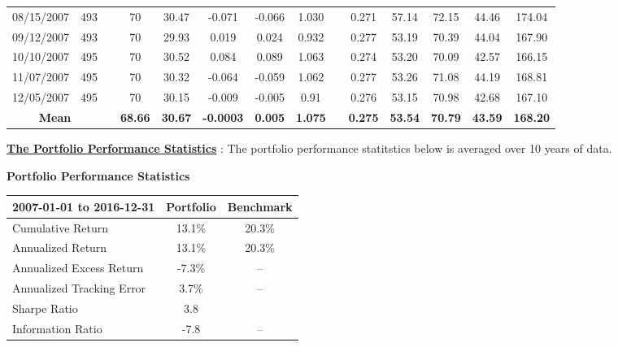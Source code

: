 \documentclass[11pt]{article}
\begin{document}
\begin{table}[]
{\begin{tabular}{cccccccccccccc}
				08/15/2007 & 493 &  & 70 & 30.47 & -0.071 & -0.066 & 1.030 &  & 0.271 & 57.14 & 72.15 & 44.46 & 174.04 \\
				09/12/2007 & 493 &  & 70 & 29.93 & 0.019 & 0.024 & 0.932 &  & 0.277 & 53.19 & 70.39 & 44.04 & 167.90 \\
				10/10/2007 & 495 & \multicolumn{1}{l}{} & 70 & 30.52 & 0.084 & 0.089 & 1.063 & \multicolumn{1}{l}{} & 0.274 & 53.20 & 70.09 & 42.57 & 166.15 \\
				11/07/2007 & 495 & \multicolumn{1}{l}{} & 70 & 30.32 & -0.064 & -0.059 & 1.062 & \multicolumn{1}{l}{} & 0.277 & 53.26 & 71.08 & 44.19 & 168.81 \\
				12/05/2007 & 495 & \multicolumn{1}{l}{} & 70 & 30.15 & -0.009 & -0.005 & 0.91 & \multicolumn{1}{l}{} & 0.276 & 53.15 & 70.98 & 42.68 & 167.10 \\
				\cline{1-2} \cline{4-8} \cline{10-14} 
				\multicolumn{2}{c}{\textbf{Mean}} & \multicolumn{1}{l}{} & \textbf{68.66} & \textbf{30.67} & \textbf{-0.0003} & \textbf{0.005} & \textbf{1.075} & \multicolumn{1}{l}{} & \textbf{0.275} & \textbf{53.54} & \textbf{70.79} & \textbf{43.59} & \textbf{168.20} \\
				\bottomrule
			\end{tabular}%
		}
	\end{table}
	
	\underline{\textbf{The Portfolio Performance Statistics}} :  The portfolio performance statitstics below is averaged over 10 years of data.
	\begin{center}
		\textbf{Portfolio Performance Statistics}\vspace*{-14pt}
	\end{center}
	
	\begin{table}[htbp]
		\def\arraystretch{1.4}
		\begin{center}
			\begin{tabular}{|l|c|c|}
				\hline
				\textbf{2007-01-01 to 2016-12-31}& 
				\textbf{Portfolio}& 
				\textbf{Benchmark} \\
				\hline
				Cumulative Return& 
				{13.1\%}& 
				{20.3\%} \\
				\hline
				Annualized Return& 
				{13.1\%}& 
				{20.3\%} \\
				\hline
				Annualized Excess Return& 
				{-7.3\%}& 
				-- \\
				\hline
				Annualized Tracking Error& 
				{3.7\%}& 
				-- \\
				\hline
				Sharpe Ratio& 
				3.8& 
				\\
				\hline
				Information Ratio& 
				-7.8& 
				-- \\
				\hline
			\end{tabular}
			\label{tab1}
		\end{center}
	\end{table}
	
\end{document}
